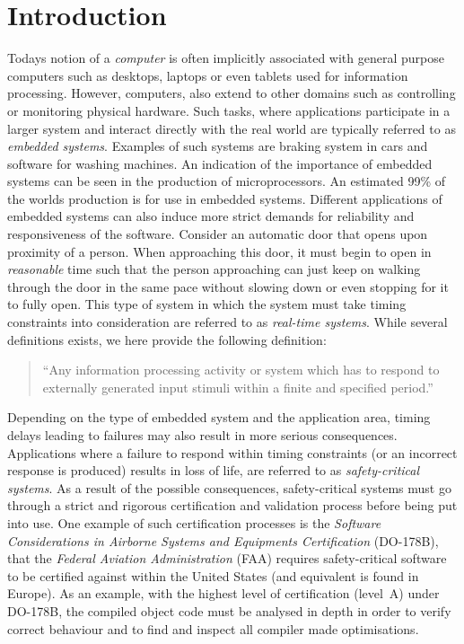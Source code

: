 \chapter{Introduction}
\label{chapter:introduction}
Todays notion of a \textit{computer} is often implicitly associated with general purpose computers such as desktops, laptops or even tablets used for information processing. However, computers, also extend to other domains such as controlling or monitoring physical hardware. Such tasks, where applications participate in a larger system and interact directly with the real world are typically referred to as \textit{embedded systems}. Examples of such systems are braking system in cars and software for washing machines. An indication of the importance of embedded systems can be seen in the production of microprocessors. An estimated 99\% of the worlds production is for use in embedded systems\cite{alan2001real}. Different applications of embedded systems can also induce more strict demands for reliability and responsiveness of the software. Consider an automatic door that opens upon proximity of a person. When approaching this door, it must begin to open in \textit{reasonable} time such that the person approaching can just keep on walking through the door in the same pace without slowing down or even stopping for it to fully open. This type of system in which the system must take timing constraints into consideration are referred to as \textit{real-time systems}. While several definitions exists, we here provide the following definition:

\begin{quotation}
``Any information processing activity or system which has to respond to externally generated input stimuli within a finite and specified period.''~\cite{alan2001real}
\end{quotation}

Depending on the type of embedded system and the application area, timing delays leading to failures may also result in more serious consequences. Applications where a failure to respond within timing constraints (or an incorrect response is produced) results in loss of life, are referred to as \textit{safety-critical systems}\cite{SCJSpec}. As a result of the possible consequences, safety-critical systems must go through a strict and rigorous certification and validation process before being put into use. One example of such certification processes is the \textit{Software Considerations in Airborne Systems and Equipments Certification} (DO-178B)\cite{DO178B}, that the \textit{Federal Aviation Administration} (FAA) requires safety-critical software to be certified against within the United States (and equivalent is found in Europe). As an example, with the highest level of certification (level~A) under DO-178B, the compiled object code must be analysed in depth in order to verify correct behaviour and to find and inspect all compiler made optimisations\cite{DO178B-Example}.

